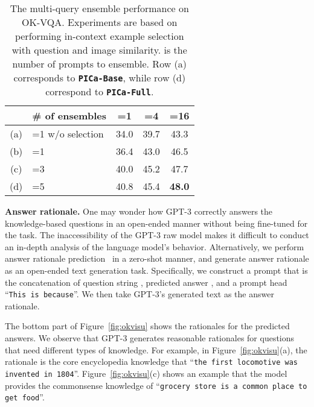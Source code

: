 \begin{table}[t]
\small \centering
\centering
\begin{tabular}{ c l || c c c }
    \hline
    & \# of ensembles & =1 & =4 & =16\\
    \hline
    (a) & =1 w/o selection & 34.0 & 39.7 & 43.3  \\
    (b) & =1 & 36.4 & 43.0 & 46.5  \\
    (c) & =3 & 40.0 & 45.2 & 47.7  \\
    (d) & =5 & 40.8 & 45.4 & \textbf{48.0}  \\
    \hline\end{tabular}
\vspace{-2mm}
\caption{\small The multi-query ensemble performance on OK-VQA. Experiments are based on performing in-context example selection with question and image similarity.  is the number of prompts to ensemble. Row (a) corresponds to \textbf{\texttt{PICa-Base}}, while row (d) correspond to \textbf{\texttt{PICa-Full}}.}
\label{table:ensemble}
\vspace{-3mm}
\end{table}

\vspace{2mm}
\noindent\textbf{Answer rationale.}
One may wonder how GPT-3 correctly answers the knowledge-based questions in an open-ended manner without being fine-tuned for the task. The inaccessibility of the GPT-3 raw model makes it difficult to conduct an in-depth analysis of the language model's behavior. Alternatively, we perform answer rationale prediction~\cite{li2018vqa,park2018multimodal,zellers2019recognition} in a zero-shot manner, and generate answer rationale as an open-ended text generation task. Specifically, we construct a prompt that is the concatenation of question string , predicted answer , and a prompt head ``\texttt{This is because}''. We then take GPT-3's generated text as the answer rationale.

The bottom part of Figure~\ref{fig:okvisu} shows the rationales for the predicted answers. We observe that GPT-3 generates reasonable rationales for questions that need different types of knowledge. For example, in Figure~\ref{fig:okvisu}(a), the rationale is the core encyclopedia knowledge that ``\texttt{the first locomotive was invented in 1804}''. Figure~\ref{fig:okvisu}(c) shows an example that the model provides the commonsense knowledge of ``\texttt{grocery store is a common place to get food}''.


